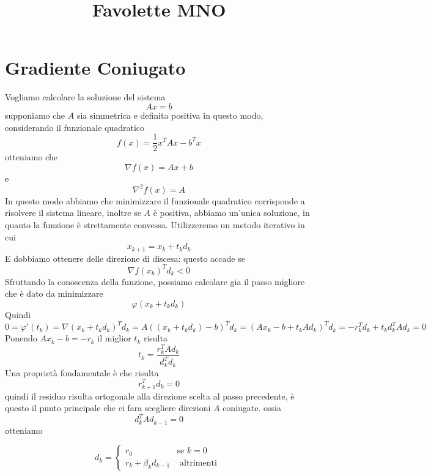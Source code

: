 \documentclass[a4paper,10pt]{article}
\title{Favolette MNO}
\author{}
\begin{document}
\maketitle

\begin{abstract}

\end{abstract}

\section{Gradiente Coniugato}

Vogliamo calcolare la soluzione del sistema 
$$ Ax=b$$
supponiamo che $A$ sia simmetrica e definita positiva
in questo modo,
considerando il funzionale quadratico
$$ f(x) = \frac{1}{2} x^{T}Ax -b^{T}x$$
otteniamo che
$$\nabla f(x) = Ax+b $$
e 
$$\nabla^{2} f(x) = A  $$
In questo modo abbiamo che minimizzare il funzionale quadratico
corrisponde a risolvere il sistema lineare, inoltre se $A$ \`e positiva,
abbiamo un'unica soluzione, in quanto la funzione \`e strettamente convessa.
Utilizzeremo un metodo iterativo in cui
$$ x_{k+1} = x_{k} + t_k d_k$$
E dobbiamo ottenere delle direzione di discesa: questo accade
se 
$$ \nabla f(x_k)^{T}d_k < 0 $$
Sfruttando la conoscenza della funzione, possiamo calcolare gia
il passo migliore che \`e dato da
minimizzare
$$ \varphi(x_k + t_k d_k) $$
Quindi
$$ 0 = \varphi'(t_k) = \nabla(x_k + t_k d_k)^{T} d_k = 
 A((x_k + t_k d_k)-b)^{T} d_k = (Ax_k -b + t_kA d_k)^{T} d_k =
-r_k^{T}d_k + t_k d_k^{T} A d_k = 0
$$
Ponendo $Ax_k -b = -r_k$ il miglior $t_k$ risulta
$$ t_k = \frac{r_k^{T}Ad_k}{d_k^{T}d_k}$$ 
Una propriet\`a fondamentale \`e che risulta
$$ r^{T}_{k+1} d_k =0 $$
quindi il residuo risulta ortogonale alla direzione scelta al passo precedente,
\`e questo il punto principale che ci fara scegliere direzioni $A$ coniugate.
ossia
$$ d_k^{T} A d_{k-1} =0$$
otteniamo

$$
 d_k =
\left\{
\begin{array}{ll}
r_0  & \text{se }  k=0 \\
 r_k + \beta_k d_{k-1} & \text{ altrimenti }
\end{array}
\right.
$$
\end{document}
